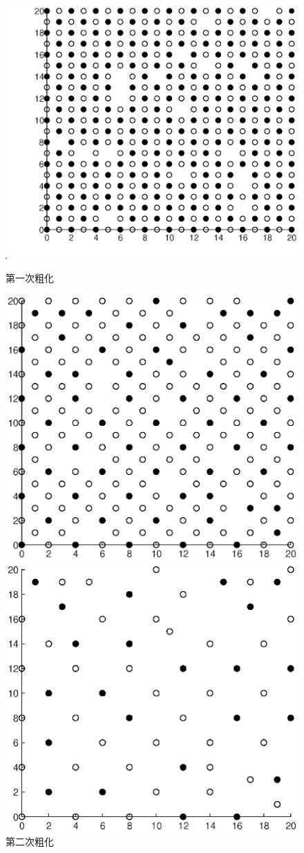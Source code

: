 \documentclass[lang=cn,10pt]{elegantbook}
\begin{document}
\begin{figure}[H]
  \centering
  \begin{minipage}[t]{0.45\linewidth}
      \centering
      \includegraphics[width=0.7\linewidth]{figure/4-3-1.eps}
      \caption*{\small 第一次粗化}
  \end{minipage}
  \begin{minipage}[t]{0.45\linewidth}
    \centering
    \includegraphics[width=0.7\linewidth]{figure/4-3-2.eps}
    \caption*{\small 第二次粗化}
  \end{minipage}
  \begin{minipage}[t]{0.45\linewidth}
    \centering
    \includegraphics[width=0.7\linewidth]{figure/4-3-3.eps}

\end{minipage}
\end{figure}
\end{document}
